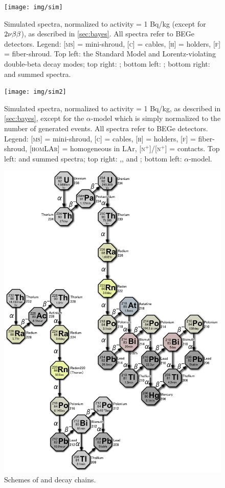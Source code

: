 \begin{landscape}
\begin{figure}
	\texttt{[image: img/sim]}
	\caption{Simulated spectra, normalized to activity = 1 Bq/kg (except for $2\nu\beta\beta$), as described in \cref{sec:bayes}. All spectra refer to BEGe detectors. Legend: \textsc{[ms]} = mini-shroud, \textsc{[c]} = cables, \textsc{[h]} = holders, \textsc{[f]} = fiber-shroud. Top left: the Standard Model and Lorentz-violating double-beta decay modes; top right: ; bottom left: ; bottom right:  and  summed spectra.}
	\label{fig:simspectra}
\end{figure}
\end{landscape}
\begin{landscape}
\begin{figure}
	\texttt{[image: img/sim2]}
	\caption{Simulated spectra, normalized to activity = 1 Bq/kg, as described in \cref{sec:bayes}, except for the $\alpha$-model which is simply normalized to the number of generated events. All spectra refer to BEGe detectors. Legend: \textsc{[ms]} = mini-shroud, \textsc{[c]} = cables, \textsc{[h]} = holders, \textsc{[f]} = fiber-shroud, \textsc{[homLAr]} = homogeneous in LAr, \textsc{[n$^+$]}/\textsc{[n$^+$]} = contacts. Top left:  and  summed spectra; top right: ,, and ; bottom left: $\alpha$-model.}
	\label{fig:simspectra2}
\end{figure}
\end{landscape}
	\begin{figure}
		\centerline{%
			\includegraphics[width=\linewidth]{img/chains.png}
		}
		\caption{Schemes of  and  decay chains.}\label{fig:chains}
	\end{figure}
\restoregeometry
